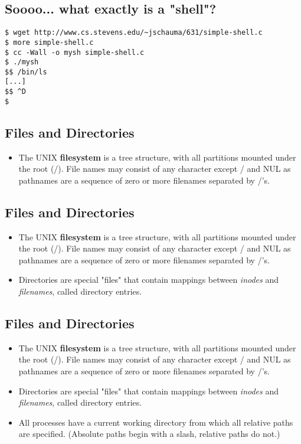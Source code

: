 \documentclass[xga]{xdvislides}
\begin{document}
\subsection{Soooo... what exactly is a "shell"?}
\vspace*{\fill}
\begin{verbatim}
$ wget http://www.cs.stevens.edu/~jschauma/631/simple-shell.c
$ more simple-shell.c
$ cc -Wall -o mysh simple-shell.c
$ ./mysh
$$ /bin/ls
[...]
$$ ^D
$
\end{verbatim}
\vspace*{\fill}


\subsection{Files and Directories}
\begin{itemize}
	\item The UNIX {\bf filesystem} is a tree structure, with all partitions
		mounted under the root (/). File names may consist of any
		character except / and NUL as pathnames are a sequence of
		zero or more filenames separated by /'s.
\end{itemize}

\subsection{Files and Directories}
\begin{itemize}
	\item The UNIX {\bf filesystem} is a tree structure, with all partitions
		mounted under the root (/). File names may consist of any
		character except / and NUL as pathnames are a sequence of
		zero or more filenames separated by /'s.
	\item Directories are special "files" that contain mappings
		between {\em inodes} and {\em filenames}, called directory
		entries.
\end{itemize}


\subsection{Files and Directories}
\begin{itemize}
	\item The UNIX {\bf filesystem} is a tree structure, with all partitions
		mounted under the root (/). File names may consist of any
		character except / and NUL as pathnames are a sequence of
		zero or more filenames separated by /'s.
	\item Directories are special "files" that contain mappings
		between {\em inodes} and {\em filenames}, called directory
		entries.
	\item All processes have a current working directory from which
		all relative paths are specified. (Absolute paths begin
		with a slash, relative paths do not.)
\end{itemize}
\end{document}
